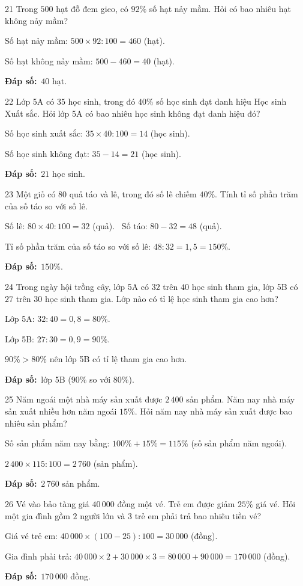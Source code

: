 \documentclass[11pt]{article}
\newif\ifsol \solfalse
\providecommand{\AnsWord}{Đáp số}
\newcommand{\dapso}[1]{\par\textbf{\AnsWord:}\ #1}
\newcommand{\probsol}[1]{%
  \begin{lrbox}{\solmeasure}\begin{minipage}{\dimexpr\linewidth-24pt\relax}#1\end{minipage}\end{lrbox}%
  \ifsol
    \begin{solbox}#1\end{solbox}%
  \else
    \setlength{\solht}{\dimexpr\ht\solmeasure+\dp\solmeasure+0.85cm\relax}%
    \ifdim\solht<1.35cm\setlength{\solht}{1.35cm}\fi
    \begin{tcolorbox}[colback=white,colframe=Line,boxrule=0.8pt,arc=5pt,
      left=8pt,right=8pt,top=4pt,bottom=4pt,height=\solht]{\footnotesize\color{Slate}\itshape\WorkWord}\end{tcolorbox}%
  \fi}
\newcommand{\gap}{\vspace{0.3cm}}
\def\WorkWord{Bài làm:}
\def\AnsWord{Đáp số}
\begin{document}
\gap
\begin{probbox}{21}{\relax}
Trong $500$ hạt đỗ đem gieo, có $92\%$ số hạt nảy mầm. Hỏi có bao nhiêu hạt không nảy mầm?
\end{probbox}
\probsol{
Số hạt nảy mầm: $500\times92:100=460$ (hạt).\par
Số hạt không nảy mầm: $500-460=40$ (hạt).
\dapso{$40$ hạt.}}
\gap
\begin{probbox}{22}{\relax}
Lớp 5A có $35$ học sinh, trong đó $40\%$ số học sinh đạt danh hiệu Học sinh Xuất sắc. Hỏi lớp 5A có bao nhiêu học sinh không đạt danh hiệu đó?
\end{probbox}
\probsol{
Số học sinh xuất sắc: $35\times40:100=14$ (học sinh).\par
Số học sinh không đạt: $35-14=21$ (học sinh).
\dapso{$21$ học sinh.}}
\gap
\begin{probbox}{23}{\relax}
Một giỏ có $80$ quả táo và lê, trong đó số lê chiếm $40\%$. Tính tỉ số phần trăm của số táo so với số lê.
\end{probbox}
\probsol{
Số lê: $80\times40:100=32$ (quả). \ Số táo: $80-32=48$ (quả).\par
Tỉ số phần trăm của số táo so với số lê: $48:32=1{,}5=150\%$.
\dapso{$150\%$.}}
\gap
\begin{probbox}{24}{\relax}
Trong ngày hội trồng cây, lớp 5A có $32$ trên $40$ học sinh tham gia, lớp 5B có $27$ trên $30$ học sinh tham gia. Lớp nào có tỉ lệ học sinh tham gia cao hơn?
\end{probbox}
\probsol{
Lớp 5A: $32:40=0{,}8=80\%$.\par
Lớp 5B: $27:30=0{,}9=90\%$.\par
$90\%>80\%$ nên lớp 5B có tỉ lệ tham gia cao hơn.
\dapso{lớp 5B ($90\%$ so với $80\%$).}}
\gap
\begin{probbox}{25}{\relax}
Năm ngoái một nhà máy sản xuất được $2\,400$ sản phẩm. Năm nay nhà máy sản xuất nhiều hơn năm ngoái $15\%$. Hỏi năm nay nhà máy sản xuất được bao nhiêu sản phẩm?
\end{probbox}
\probsol{
Số sản phẩm năm nay bằng: $100\%+15\%=115\%$ (số sản phẩm năm ngoái).\par
$2\,400\times115:100=2\,760$ (sản phẩm).
\dapso{$2\,760$ sản phẩm.}}
\gap
\begin{probbox}{26}{\relax}
Vé vào bảo tàng giá $40\,000$ đồng một vé. Trẻ em được giảm $25\%$ giá vé. Hỏi một gia đình gồm $2$ người lớn và $3$ trẻ em phải trả bao nhiêu tiền vé?
\end{probbox}
\probsol{
Giá vé trẻ em: $40\,000\times(100-25):100=30\,000$ (đồng).\par
Gia đình phải trả: $40\,000\times2+30\,000\times3=80\,000+90\,000=170\,000$ (đồng).
\dapso{$170\,000$ đồng.}}
\end{document}

